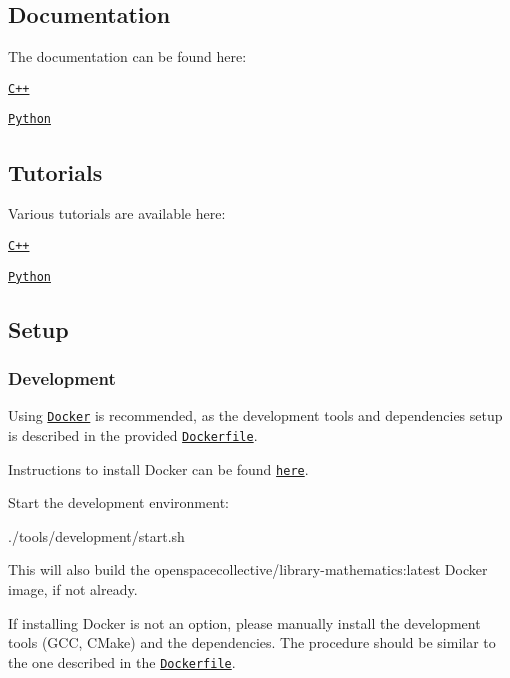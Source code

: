\subsection*{Documentation}

The documentation can be found here\+:


\begin{DoxyItemize}
\item \href{https://open-space-collective.github.io/library-mathematics}{\tt C++}
\item \href{./bindings/python/docs}{\tt Python}
\end{DoxyItemize}

\subsection*{Tutorials}

Various tutorials are available here\+:


\begin{DoxyItemize}
\item \href{./tutorials/cpp}{\tt C++}
\item \href{./tutorials/python}{\tt Python}
\end{DoxyItemize}

\subsection*{Setup}

\subsubsection*{Development}

Using \href{https://www.docker.com}{\tt Docker} is recommended, as the development tools and dependencies setup is described in the provided \href{./tools/development/docker/Dockerfile}{\tt Dockerfile}.

Instructions to install Docker can be found \href{https://docs.docker.com/install/}{\tt here}.

Start the development environment\+:


\begin{DoxyCode}
./tools/development/start.sh
\end{DoxyCode}


This will also build the {\ttfamily openspacecollective/library-\/mathematics\+:latest} Docker image, if not already.

If installing Docker is not an option, please manually install the development tools (G\+CC, C\+Make) and the dependencies. The procedure should be similar to the one described in the \href{./tools/development/docker/Dockerfile}{\tt Dockerfile}.

